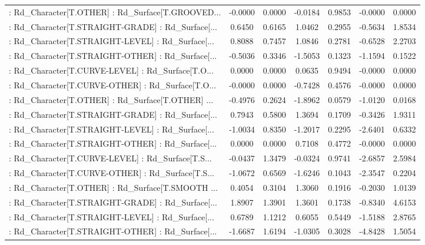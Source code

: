 \begin{longtable}{p{4cm}cccccc}
 : Rd\_Character[T.OTHER] : Rd\_Surface[T.GROOVED... & -0.0000 &    0.0000 & -0.0184 &       0.9853 & -0.0000 &  0.0000 \\
 : Rd\_Character[T.STRAIGHT-GRADE] : Rd\_Surface[... &  0.6450 &    0.6165 &  1.0462 &       0.2955 & -0.5634 &  1.8534 \\
 : Rd\_Character[T.STRAIGHT-LEVEL] : Rd\_Surface[... &  0.8088 &    0.7457 &  1.0846 &       0.2781 & -0.6528 &  2.2703 \\
 : Rd\_Character[T.STRAIGHT-OTHER] : Rd\_Surface[... & -0.5036 &    0.3346 & -1.5053 &       0.1323 & -1.1594 &  0.1522 \\
 : Rd\_Character[T.CURVE-LEVEL] : Rd\_Surface[T.O... &  0.0000 &    0.0000 &  0.0635 &       0.9494 & -0.0000 &  0.0000 \\
 : Rd\_Character[T.CURVE-OTHER] : Rd\_Surface[T.O... & -0.0000 &    0.0000 & -0.7428 &       0.4576 & -0.0000 &  0.0000 \\
 : Rd\_Character[T.OTHER] : Rd\_Surface[T.OTHER] ... & -0.4976 &    0.2624 & -1.8962 &       0.0579 & -1.0120 &  0.0168 \\
 : Rd\_Character[T.STRAIGHT-GRADE] : Rd\_Surface[... &  0.7943 &    0.5800 &  1.3694 &       0.1709 & -0.3426 &  1.9311 \\
 : Rd\_Character[T.STRAIGHT-LEVEL] : Rd\_Surface[... & -1.0034 &    0.8350 & -1.2017 &       0.2295 & -2.6401 &  0.6332 \\
 : Rd\_Character[T.STRAIGHT-OTHER] : Rd\_Surface[... &  0.0000 &    0.0000 &  0.7108 &       0.4772 & -0.0000 &  0.0000 \\
 : Rd\_Character[T.CURVE-LEVEL] : Rd\_Surface[T.S... & -0.0437 &    1.3479 & -0.0324 &       0.9741 & -2.6857 &  2.5984 \\
 : Rd\_Character[T.CURVE-OTHER] : Rd\_Surface[T.S... & -1.0672 &    0.6569 & -1.6246 &       0.1043 & -2.3547 &  0.2204 \\
 : Rd\_Character[T.OTHER] : Rd\_Surface[T.SMOOTH ... &  0.4054 &    0.3104 &  1.3060 &       0.1916 & -0.2030 &  1.0139 \\
 : Rd\_Character[T.STRAIGHT-GRADE] : Rd\_Surface[... &  1.8907 &    1.3901 &  1.3601 &       0.1738 & -0.8340 &  4.6153 \\
 : Rd\_Character[T.STRAIGHT-LEVEL] : Rd\_Surface[... &  0.6789 &    1.1212 &  0.6055 &       0.5449 & -1.5188 &  2.8765 \\
 : Rd\_Character[T.STRAIGHT-OTHER] : Rd\_Surface[... & -1.6687 &    1.6194 & -1.0305 &       0.3028 & -4.8428 &  1.5054 \\

\end{longtable}
